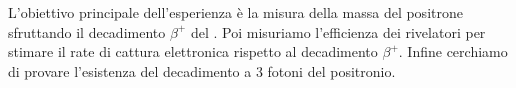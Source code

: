 L'obiettivo principale dell'esperienza è la misura della massa del positrone sfruttando il decadimento $\beta^+$ del \na{}. Poi misuriamo l'efficienza dei rivelatori per stimare il rate di cattura elettronica rispetto al decadimento $\beta^+$. Infine cerchiamo di provare l'esistenza del decadimento a 3 fotoni del positronio.